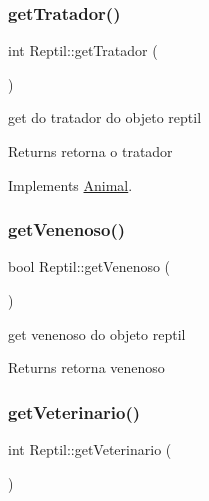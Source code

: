\subsubsection{\texorpdfstring{getTratador()}{getTratador()}}
{\footnotesize\ttfamily int Reptil\+::get\+Tratador (\begin{DoxyParamCaption}{ }\end{DoxyParamCaption})\hspace{0.3cm}{\ttfamily [virtual]}}



get do tratador do objeto reptil 

\begin{DoxyReturn}{Returns}
retorna o tratador 
\end{DoxyReturn}


Implements \mbox{\hyperlink{class_animal}{Animal}}.

\mbox{\label{class_reptil_a75138aaa91420a9f82ddd39c19ea8b78}} 
\subsubsection{\texorpdfstring{getVenenoso()}{getVenenoso()}}
{\footnotesize\ttfamily bool Reptil\+::get\+Venenoso (\begin{DoxyParamCaption}{ }\end{DoxyParamCaption})}



get venenoso do objeto reptil 

\begin{DoxyReturn}{Returns}
retorna venenoso 
\end{DoxyReturn}
\mbox{\label{class_reptil_a129499f023203e4def4a3f86471c704e}} 
\subsubsection{\texorpdfstring{getVeterinario()}{getVeterinario()}}
{\footnotesize\ttfamily int Reptil\+::get\+Veterinario (\begin{DoxyParamCaption}{ }\end{DoxyParamCaption})\hspace{0.3cm}{\ttfamily [virtual]}}



